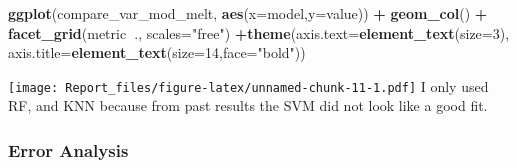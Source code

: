 \documentclass[]{article}
\newenvironment{Shaded}{\begin{snugshade}}{\end{snugshade}}
\newcommand{\KeywordTok}[1]{\textcolor[rgb]{0.13,0.29,0.53}{\textbf{#1}}}
\newcommand{\DataTypeTok}[1]{\textcolor[rgb]{0.13,0.29,0.53}{#1}}
\newcommand{\DecValTok}[1]{\textcolor[rgb]{0.00,0.00,0.81}{#1}}
\newcommand{\StringTok}[1]{\textcolor[rgb]{0.31,0.60,0.02}{#1}}
\newcommand{\CommentTok}[1]{\textcolor[rgb]{0.56,0.35,0.01}{\textit{#1}}}
\newcommand{\OperatorTok}[1]{\textcolor[rgb]{0.81,0.36,0.00}{\textbf{#1}}}
\newcommand{\NormalTok}[1]{#1}
\begin{document}
\begin{Shaded}
\begin{Highlighting}[]
\KeywordTok{ggplot}\NormalTok{(compare_var_mod_melt, }\KeywordTok{aes}\NormalTok{(}\DataTypeTok{x=}\NormalTok{model,}\DataTypeTok{y=}\NormalTok{value)) }\OperatorTok{+}\StringTok{ }\KeywordTok{geom_col}\NormalTok{() }\OperatorTok{+}\StringTok{ }\KeywordTok{facet_grid}\NormalTok{(metric}\OperatorTok{~}\NormalTok{., }\DataTypeTok{scales=}\StringTok{"free"}\NormalTok{) }\OperatorTok{+}\KeywordTok{theme}\NormalTok{(}\DataTypeTok{axis.text=}\KeywordTok{element_text}\NormalTok{(}\DataTypeTok{size=}\DecValTok{3}\NormalTok{),}
        \DataTypeTok{axis.title=}\KeywordTok{element_text}\NormalTok{(}\DataTypeTok{size=}\DecValTok{14}\NormalTok{,}\DataTypeTok{face=}\StringTok{"bold"}\NormalTok{))}
\end{Highlighting}
\end{Shaded}

\texttt{[image: Report\_files/figure-latex/unnamed-chunk-11-1.pdf]} I
only used RF, and KNN because from past results the SVM did not look
like a good fit.

\subsubsection{Error Analysis}\label{error-analysis}

\begin{Shaded}
\end{Shaded}
\end{document}
